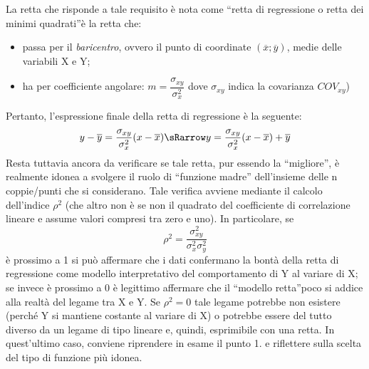  La retta che risponde a tale requisito è nota come \textquotedblleft retta 
di regressione  o retta dei minimi quadrati\textquotedblright è la retta 
che:
\begin{itemize}[nosep]
\item passa per il \emph{baricentro}, ovvero il punto di coordinate 
\((\overline{x};\overline{y})\), medie delle variabili X e Y;
\item ha per coefficiente angolare:
\(m=\dfrac{\sigma_{xy}}{\sigma^2_{x}}\) 
dove \(\sigma_{xy}\) indica la covarianza \(COV_{xy}\))
\end{itemize}
Pertanto, l'espressione finale della retta di regressione è la seguente:
\[y-\overline{y}=\frac{\sigma_{xy}}{\sigma^2_{x}}(x-\overline{x})
  \sRarrow
  y=\frac{\sigma_{xy}}{\sigma^2_{x}}(x-\overline{x})+\overline{y}\]
Resta tuttavia ancora da verificare se tale retta, pur essendo la 
\textquotedblleft migliore\textquotedblright,  è realmente idonea a 
svolgere il ruolo di \textquotedblleft funzione madre\textquotedblright 
dell'insieme delle n coppie/punti che si considerano. Tale verifica avviene 
mediante il calcolo dell'indice \(\rho^2\) (che altro non è se non il 
quadrato del coefficiente di correlazione lineare e assume valori compresi 
tra zero e uno).
 In particolare,  se
 \[\rho^2=\frac{\sigma^2_{xy}}{\sigma^2_{x}\sigma^2_{y}}\]
 è prossimo a 1 si può affermare che i dati confermano la bontà della  
retta di regressione  come modello interpretativo del comportamento di Y al 
variare di X; se invece è prossimo a 0 è legittimo affermare che il 
\textquotedblleft modello retta\textquotedblright poco si addice alla 
realtà del legame tra X e Y.  Se \(\rho^2=0\) tale legame potrebbe non 
esistere (perché Y si mantiene costante al variare di X) o potrebbe essere 
del tutto diverso da un legame di tipo lineare e, quindi, esprimibile con 
una retta. In quest'ultimo caso, conviene riprendere in esame il punto 1. e 
riflettere sulla scelta del tipo di funzione più idonea.

